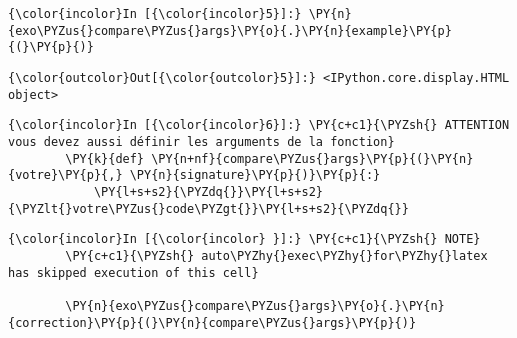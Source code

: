     \begin{Verbatim}[commandchars=\\\{\}]
{\color{incolor}In [{\color{incolor}5}]:} \PY{n}{exo\PYZus{}compare\PYZus{}args}\PY{o}{.}\PY{n}{example}\PY{p}{(}\PY{p}{)}
\end{Verbatim}


\begin{Verbatim}[commandchars=\\\{\}]
{\color{outcolor}Out[{\color{outcolor}5}]:} <IPython.core.display.HTML object>
\end{Verbatim}
            
    \begin{Verbatim}[commandchars=\\\{\}]
{\color{incolor}In [{\color{incolor}6}]:} \PY{c+c1}{\PYZsh{} ATTENTION vous devez aussi définir les arguments de la fonction}
        \PY{k}{def} \PY{n+nf}{compare\PYZus{}args}\PY{p}{(}\PY{n}{votre}\PY{p}{,} \PY{n}{signature}\PY{p}{)}\PY{p}{:}
            \PY{l+s+s2}{\PYZdq{}}\PY{l+s+s2}{\PYZlt{}votre\PYZus{}code\PYZgt{}}\PY{l+s+s2}{\PYZdq{}}
\end{Verbatim}


    \begin{Verbatim}[commandchars=\\\{\}]
{\color{incolor}In [{\color{incolor} }]:} \PY{c+c1}{\PYZsh{} NOTE}
        \PY{c+c1}{\PYZsh{} auto\PYZhy{}exec\PYZhy{}for\PYZhy{}latex has skipped execution of this cell}
        
        \PY{n}{exo\PYZus{}compare\PYZus{}args}\PY{o}{.}\PY{n}{correction}\PY{p}{(}\PY{n}{compare\PYZus{}args}\PY{p}{)}
\end{Verbatim}



    
    
    
